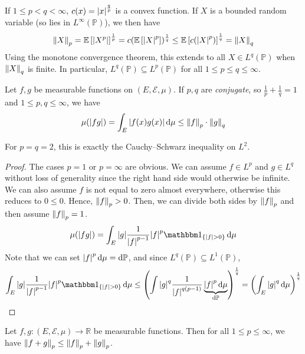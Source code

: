 \begin{remark}
	If \( 1 \leq p < q < \infty \), \( c(x) = \abs{x}^{\frac{q}{p}} \) is a convex function.
	If \( X \) is a bounded random variable (so lies in \( L^\infty(\mathbb P) \)), we then have
	\[ \norm{X}_p = \mathbb{E}\left[{\abs{X^p}}\right]^{\frac{1}{p}} = c(\mathbb{E}\left[{\abs{X}^p}\right])^{\frac{1}{q}} \leq \mathbb{E}\left[{c(\abs{X}^p)}\right]^{\frac{1}{q}} = \norm{X}_q \]
	Using the monotone convergence theorem, this extends to all \( X \in L^q(\mathbb P) \) when \( \norm{X}_q \) is finite.
	In particular, \( L^q(\mathbb P) \subseteq L^p(\mathbb P) \) for all \( 1 \leq p \leq q \leq \infty \).
\end{remark}
\begin{theorem}
	Let \( f, g \) be measurable functions on \( (E,\mathcal E,\mu) \).
	If \( p, q \) are \emph{conjugate}, so \( \frac{1}{p} + \frac{1}{q} = 1 \) and \( 1 \leq p, q \leq \infty \), we have
	\[ \mu(\abs{fg}) = \int_E \abs{f(x)g(x)} \dd{\mu} \leq \norm{f}_p \cdot \norm{g}_q \]
\end{theorem}
\begin{remark}
	For \( p = q = 2 \), this is exactly the Cauchy--Schwarz inequality on \( L^2 \).
\end{remark}
\begin{proof}
	The cases \( p = 1 \) or \( p = \infty \) are obvious.
	We can assume \( f \in L^p \) and \( g \in L^q \) without loss of generality since the right hand side would otherwise be infinite.
	We can also assume \( f \) is not equal to zero almost everywhere, otherwise this reduces to \( 0 \leq 0 \).
	Hence, \( \norm{f}_p > 0 \).
	Then, we can divide both sides by \( \norm{f}_p \) and then assume \( \norm{f}_p = 1 \).
	\[ \mu(\abs{fg}) = \int_E \abs{g} \frac{1}{\abs{f}^{p-1}} \abs{f}^p \mathbbm 1_{\qty{\abs{f} > 0}} \dd{\mu} \]
	Note that we can set \( \abs{f}^p \dd{\mu} = \dd{\mathbb P} \), and since \( L^q(\mathbb P) \subseteq L^1(\mathbb P) \),
	\[ \int_E \abs{g} \frac{1}{\abs{f}^{p-1}} \abs{f}^p \mathbbm 1_{\qty{\abs{f} > 0}} \dd{\mu} \leq \qty( \int \abs{g}^q \frac{1}{\abs{f}^{q(p-1)}} \underbrace{\abs{f}^p \dd{\mu}}_{\dd{\mathbb P}})^{\frac{1}{q}} = \qty(\int_E \abs{g}^q \dd{\mu})^{\frac{1}{q}} \]
\end{proof}
\begin{theorem}
	Let \( f, g \colon (E, \mathcal E, \mu) \to \mathbb R \) be measurable functions.
	Then for all \( 1 \leq p \leq \infty \), we have \( \norm{f + g}_p \leq \norm{f}_p + \norm{g}_p \).
\end{theorem}
